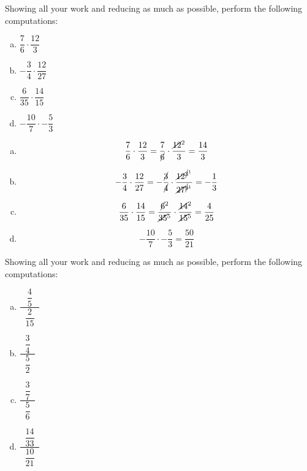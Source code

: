\documentclass[11pt,letterpaper]{article}
\begin{document}
\newpage



 Showing all your work and reducing as much as possible, perform the following computations: 
	\begin{enumerate}[(a)]
	\item $\dfrac{7}{6} \cdot \dfrac{12}{3}$
	\item $-\dfrac{3}{4} \cdot \dfrac{12}{27}$
	\item $\dfrac{6}{35} \cdot \dfrac{14}{15}$
	\item $-\dfrac{10}{7} \cdot - \dfrac{5}{3}$
	\end{enumerate} \pspace

\sol
\begin{enumerate}[(a)]
\item 
	\[
	\dfrac{7}{6} \cdot \dfrac{12}{3}= \dfrac{7}{\cancel{6}} \cdot \dfrac{\cancel{12}^2}{3}= \dfrac{14}{3}
	\] \pspace

\item 
	\[
	-\dfrac{3}{4} \cdot \dfrac{12}{27}= -\dfrac{\cancel{3}}{\cancel{4}} \cdot \dfrac{\cancel{12}^{\cancel{3}^1}}{\cancel{27}^{\cancel{9}^1}}= -\dfrac{1}{3}
	\] \pspace

\item 
	\[
	\dfrac{6}{35} \cdot \dfrac{14}{15}= \dfrac{\cancel{6}^2}{\cancel{35}^5} \cdot \dfrac{\cancel{14}^2}{\cancel{15}^5}= \dfrac{4}{25}
	\] \pspace

\item 
	\[
	-\dfrac{10}{7} \cdot - \dfrac{5}{3}= \dfrac{50}{21}
	\]
\end{enumerate}



\newpage



 Showing all your work and reducing as much as possible, perform the following computations: 
	\begin{enumerate}[(a)]
	\item $\dfrac{\;\;\dfrac{4}{5}\;\;}{\;\;\dfrac{2}{15}\;\;}$
	\item $\dfrac{\;\;\dfrac{3}{4}\;\;}{\;\;\dfrac{5}{2}\;\;}$
	\item $\dfrac{\;\;\dfrac{3}{7}\;\;}{\;\;\dfrac{5}{6}\;\;}$
	\item $\dfrac{\;\;\dfrac{14}{33}\;\;}{\;\;\dfrac{10}{21}\;\;}$
	\end{enumerate} \pspace
\end{document}

